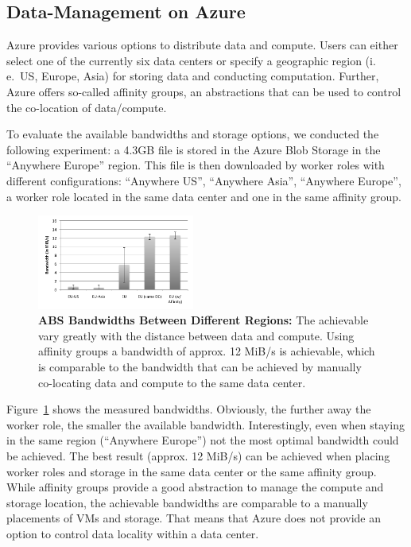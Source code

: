 \documentclass[conference,final]{IEEEtran}
\newcommand{\up}{\vspace*{-1em}}
\newcommand{\alnote}[1]{ {\textcolor{blue} { ***AL: #1 }}}
\newcommand{\jhanote}[1]{ {\textcolor{red} { ***SJ: #1 }}}
\newcommand{\alnote}[1]{}
\newcommand{\jhanote}[1]{}
\begin{document}
\subsection{Data-Management on Azure}
\up
Azure provides various options to distribute data and
compute. Users can either select one of the currently six data centers or 
specify a geographic region (i.\,e.\ US, Europe, Asia) for storing data and
conducting computation. Further, Azure offers so-called affinity groups, 
an abstractions that can be used to control the co-location of data/compute.

To evaluate the available bandwidths and storage options, we conducted
the following experiment: a 4.3GB file is stored in the Azure Blob
Storage in the ``Anywhere Europe'' region. This file is then
downloaded by worker roles with different configurations: ``Anywhere
US'', ``Anywhere Asia'', ``Anywhere Europe'', a worker role located in
the same data center and one in the same affinity group.


\begin{figure}[htbp]
    \centering
        \includegraphics[width=0.46\textwidth]{performance/azure-data-transfer.pdf}
        \caption{\textbf{ABS Bandwidths Between
            Different Regions:} The achievable vary greatly with the
          distance between data and compute. Using affinity groups a
          bandwidth of approx. 12 MiB/s is achievable, which is
          comparable to the bandwidth that can be achieved by manually
          co-locating data and compute to the same data center.  }
    \label{fig:performance_azure-data-transfer}
    \up
\end{figure}
Figure~\ref{fig:performance_azure-data-transfer} shows the measured
bandwidths. Obviously, the further away the worker role, the smaller
the available bandwidth. Interestingly, even when staying in the same
region (``Anywhere Europe'') not the most optimal bandwidth could be
achieved. The best result (approx. 12 MiB/s) can be achieved when
placing worker roles and storage in the same data center or the 
same affinity group. While affinity groups provide a good abstraction
to manage the compute and storage location, the achievable bandwidths
are comparable to a manually placements of VMs and storage. That means 
that Azure does not provide an option to control data locality within
a data center.
\end{document}

